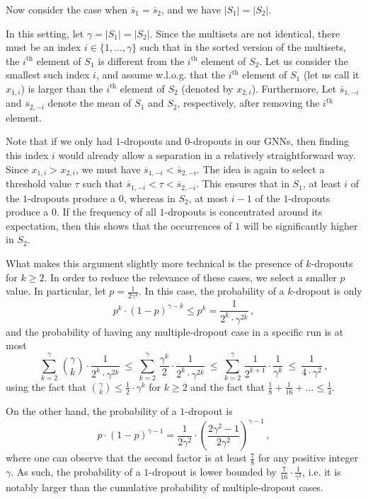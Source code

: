 \documentclass{article}
\begin{document}
Now consider the case when $\overline{s}_{1} = \overline{s}_{2}$, and we have $|S_1|=|S_2|$.

In this setting, let $\gamma=|S_1|=|S_2|$. Since the multisets are not identical, there must be an index $i \in \{ 1, ..., \gamma \}$ such that in the sorted version of the multisets, the $i^{\text{th}}$ element of $S_1$ is different from the $i^{\text{th}}$ element of $S_2$. Let us consider the smallest such index $i$, and assume w.l.o.g. that the $i^{\text{th}}$ element of $S_1$ (let us call it $x_{1, i}$) is larger than the $i^{\text{th}}$ element of $S_2$ (denoted by $x_{2, i}$). Furthermore, Let $\overline{s}_{1, -i}$ and $\overline{s}_{2, -i}$ denote the mean of $S_1$ and $S_2$, respectively, after removing the $i^{\text{th}}$ element.

Note that if we only had $1$-dropouts and $0$-dropouts in our GNNs, then finding this index $i$ would already allow a separation in a relatively straightforward way. Since $x_{1, i\!}>_{\!}x_{2, i}$, we must have $\overline{s}_{1, -i\!}<_{\!}\overline{s}_{2, -i}$. The idea is again to select a threshold value $\tau$ such that $\overline{s}_{1, -i}<\tau<\overline{s}_{2, -i}$. This ensures that in $S_1$, at least $i$ of the $1$-dropouts produce a $0$, whereas in $S_2$, at most $i-1$ of the $1$-dropouts produce a $0$. If the frequency of all $1$-dropouts is concentrated around its expectation, then this shows that the occurrences of $1$ will be significantly higher in $S_2$.

What makes this argument slightly more technical is the presence of $k$-dropouts for $k \geq 2$. In order to reduce the relevance of these cases, we select a smaller $p$ value. In particular, let $p=\frac{1}{2\gamma^2}$. In this case, the probability of a $k$-dropout is only
\[ p^k \cdot (1-p)^{\gamma-k} \leq p^k = \frac{1}{2^k \cdot \gamma^{2k}} \, ,\]
and the probability of having any multiple-dropout case in a specific run is at most
\[  \sum_{k=2}^{\gamma} \, {\binom{\gamma}{k}} \cdot \frac{1}{2^k \cdot \gamma^{2k}} \: \leq \: \sum_{k=2}^{\gamma} \, \frac{\gamma^k}{2} \cdot \frac{1}{2^k \cdot \gamma^{2k}} \: \leq \: \sum_{k=2}^{\gamma} \, \frac{1}{2^{k+1}} \cdot \frac{1}{\gamma^k} \: \leq \: \frac{1}{4 \cdot \gamma^2} \, , \]
using the fact that ${\binom{\gamma}{k}} \leq \frac{1}{2} \cdot \gamma^k$ for $k \geq 2$ and the fact that $\frac{1}{8}+\frac{1}{16}+... \leq \frac{1}{4}$.

On the other hand, the probability of a $1$-dropout is
\[ p \cdot (1-p)^{\gamma-1}  = \frac{1}{2 \gamma^2} \cdot \left( \frac{2 \gamma^2 -1}{2 \gamma^2} \right)^{\gamma-1} \, ,\]
where one can observe that the second factor is at least $\frac{7}{8}$ for any positive integer $\gamma$. As such, the probability of a $1$-dropout is lower bounded by $\frac{7}{16} \cdot \frac{1}{\gamma^2}$, i.e. it is notably larger than the cumulative probability of multiple-dropout cases.
\end{document}
